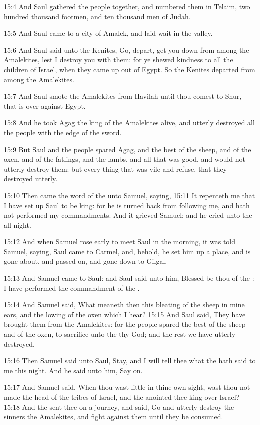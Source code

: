 15:4 And Saul gathered the people together, and numbered them in
Telaim, two hundred thousand footmen, and ten thousand men of Judah.

15:5 And Saul came to a city of Amalek, and laid wait in the valley.

15:6 And Saul said unto the Kenites, Go, depart, get you down from
among the Amalekites, lest I destroy you with them: for ye shewed
kindness to all the children of Israel, when they came up out of
Egypt. So the Kenites departed from among the Amalekites.

15:7 And Saul smote the Amalekites from Havilah until thou comest to
Shur, that is over against Egypt.

15:8 And he took Agag the king of the Amalekites alive, and utterly
destroyed all the people with the edge of the sword.

15:9 But Saul and the people spared Agag, and the best of the sheep,
and of the oxen, and of the fatlings, and the lambs, and all that was
good, and would not utterly destroy them: but every thing that was
vile and refuse, that they destroyed utterly.

15:10 Then came the word of the \LORD unto Samuel, saying, 15:11 It
repenteth me that I have set up Saul to be king: for he is turned back
from following me, and hath not performed my commandments. And it
grieved Samuel; and he cried unto the \LORD all night.

15:12 And when Samuel rose early to meet Saul in the morning, it was
told Samuel, saying, Saul came to Carmel, and, behold, he set him up a
place, and is gone about, and passed on, and gone down to Gilgal.

15:13 And Samuel came to Saul: and Saul said unto him, Blessed be thou
of the \LORD: I have performed the commandment of the \LORD.

15:14 And Samuel said, What meaneth then this bleating of the sheep in
mine ears, and the lowing of the oxen which I hear?  15:15 And Saul
said, They have brought them from the Amalekites: for the people
spared the best of the sheep and of the oxen, to sacrifice unto the
\LORD thy God; and the rest we have utterly destroyed.

15:16 Then Samuel said unto Saul, Stay, and I will tell thee what the
\LORD hath said to me this night. And he said unto him, Say on.

15:17 And Samuel said, When thou wast little in thine own sight, wast
thou not made the head of the tribes of Israel, and the \LORD anointed
thee king over Israel?  15:18 And the \LORD sent thee on a journey, and
said, Go and utterly destroy the sinners the Amalekites, and fight
against them until they be consumed.

